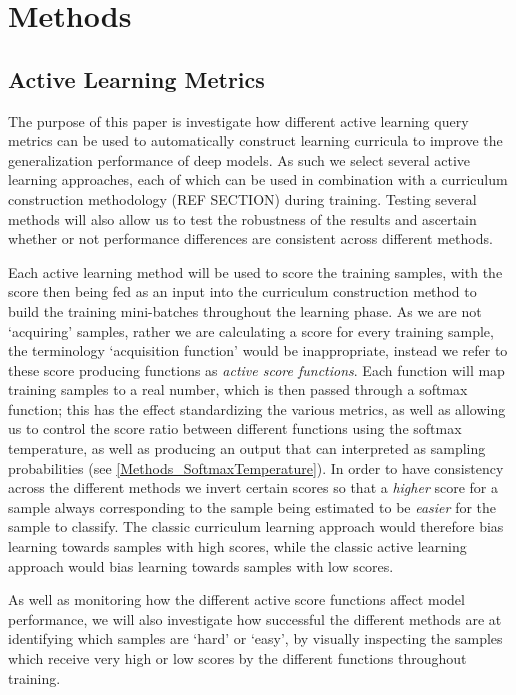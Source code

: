 \chapter{Methods}

\section{Active Learning Metrics}
The purpose of this paper is investigate how different active learning query metrics can be used to automatically construct learning curricula to improve the generalization performance of deep models. As such we select several active learning approaches, each of which can be used in combination with a curriculum construction methodology (REF SECTION) during training. Testing several methods will also allow us to test the robustness of the results and ascertain whether or not performance differences are consistent across different methods. 

Each active learning method will be used to score the training samples, with the score then being fed as an input into the curriculum construction method to build the training mini-batches throughout the learning phase. As we are not `acquiring' samples, rather we are calculating a score for every training sample, the terminology `acquisition function' would be inappropriate, instead we refer to these score producing functions as \textit{active score functions}.  Each function will map training samples to a real number, which is then passed through a softmax function; this has the effect standardizing the various metrics, as well as allowing us to control the score ratio between different functions using the softmax temperature, as well as producing an output that can interpreted as sampling probabilities (see \ref{Methods_SoftmaxTemperature}). In order to have consistency across the different methods we invert certain scores so that a \textit{higher} score for a sample always corresponding to the sample being estimated to be \textit{easier} for the sample to classify. The classic curriculum learning approach would therefore bias learning towards samples with high scores, while the classic active learning approach would bias learning towards samples with low scores. 

As well as monitoring how the different active score functions affect model performance, we will also investigate how successful the different methods are at identifying which samples are `hard' or `easy', by visually inspecting the samples which receive very high or low scores by the different functions throughout training. 
